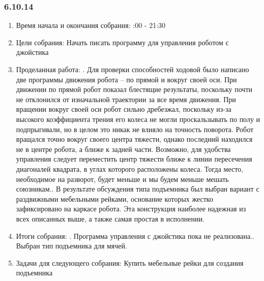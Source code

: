 \documentclass[11pt]{article}
\begin{document}
         \subsubsection{6.10.14}
         \begin{enumerate}
            \item Время начала и окончания собрания:
            :00 - 21:30
            \item Цели собрания:
            \newline
            Начать писать программу для управления роботом с джойстика
            \item Проделанная работа:
            .   Для проверки способностей ходовой было написано две программы движения робота – по прямой и вокруг своей оси. При движении по прямой робот показал блестящие результаты, поскольку почти не отклонился от изначальной траектории за все время движения. При вращении вокруг своей оси робот сильно дребезжал, поскольку из-за высокого коэффициента трения его колеса не могли проскальзывать по полу и подпрыгивали, но в целом это никак не влияло на точность поворота. Робот вращался точно вокруг своего центра тяжести, однако последний находился не в центре робота, а ближе к задней части. Возможно, для удобства управления следует переместить центр тяжести ближе к линии пересечения диагоналей квадрата, в углах которого расположены колеса. Тогда место, необходимое на разворот, будет меньше и мы будем меньше мешать союзникам..   В результате обсуждения типа подъемника был выбран вариант с раздвижными мебельными рейками, основание которых жестко зафиксировано на каркасе робота. Эта конструкция наиболее надежная из всех описанных выше, а также самая простая в исполнении.
            \newline
            \item Итоги собрания:
            .   Программа управления с джойстика пока не реализована..   Выбран тип подъемника для мячей.
            \newline
            \item Задачи для следующего собрания:
            \newline
            Купить мебельные рейки для создания подъемника
         \end{enumerate}
\end{document}
